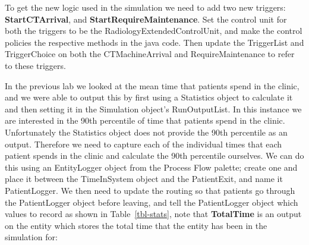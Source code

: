 \documentclass[
  10pt,
  a4paperpaper,
  DIV=11,
  numbers=noendperiod,
  oneside]{scrreprt}
\begin{document}
To get the new logic used in the simulation we need to add two new
triggers: \textbf{StartCTArrival}, and \textbf{StartRequireMaintenance}.
Set the control unit for both the triggers to be the
RadiologyExtendedControlUnit, and make the control policies the
respective methods in the java code. Then update the TriggerList and
TriggerChoice on both the CTMachineArrival and RequireMaintenance to
refer to these triggers.

In the previous lab we looked at the mean time that patients spend in
the clinic, and we were able to output this by first using a Statistics
object to calculate it and then setting it in the Simulation object's
RunOutputList. In this instance we are interested in the 90th percentile
of time that patients spend in the clinic. Unfortunately the Statistics
object does not provide the 90th percentile as an output. Therefore we
need to capture each of the individual times that each patient spends in
the clinic and calculate the 90th percentile ourselves. We can do this
using an EntityLogger object from the Process Flow palette; create one
and place it between the TimeInSystem object and the PatientExit, and
name it PatientLogger. We then need to update the routing so that
patients go through the PatientLogger object before leaving, and tell
the PatientLogger object which values to record as shown in
Table~\ref{tbl-stats}, note that \textbf{TotalTime} is an output on the
entity which stores the total time that the entity has been in the
simulation for:

\begin{table}[H]

\caption{\label{tbl-stats}Collecting Statistics}


\end{table}%
\end{document}
